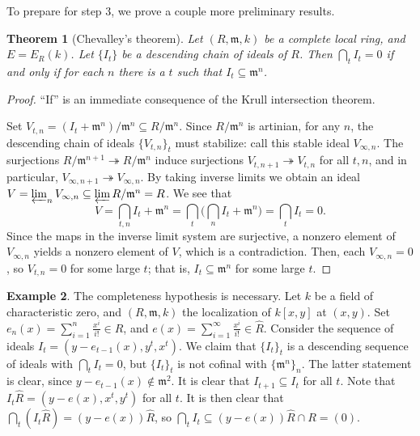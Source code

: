 \documentclass[11pt]{book}
\newtheorem{theorem}{Theorem}[chapter]
\numberwithin{equation}{section}
\numberwithin{theorem}{chapter}
\theoremstyle{definition}
\newtheorem{example}[theorem]{Example}
\newtheorem*{basic properties}{Basic Properties}
\newtheorem*{Important Remark}{Important Remark}
\theoremstyle{remark}
\newcommand{\m}{\mathfrak{m}}
\begin{document}
To prepare for step 3, we prove a couple more preliminary results.

\begin{theorem}[Chevalley's theorem]
	Let $(R,\m,k)$ be a complete local ring, and $E=E_R(k)$. Let $\{I_t\}$ be a descending chain of ideals of $R$. Then $\bigcap_t I_t=0$ if and only if for each $n$ there is a $t$ such that $I_{t} \subseteq \m^n$.
\end{theorem}
\begin{proof}
	``If'' is an immediate consequence of the Krull intersection theorem.
	
Set $V_{t,n}=(I_t + \m^n) / \m^n \subseteq R/\m^n$. Since $R/\m^n$ is artinian, for any $n$, the descending chain of ideals $\{ V_{t,n} \}_t$ must stabilize: call this stable ideal $V_{\infty,n}$. The surjections $R/\m^{n+1}\twoheadrightarrow R/\m^{n}$ induce surjections $V_{t,n+1}\twoheadrightarrow V_{t,n}$ for all $t,n$, and in particular, $V_{\infty,n+1}\twoheadrightarrow V_{\infty,n}$. By taking inverse limits we obtain an ideal $V=\varprojlim_n V_{\infty,n} \subseteq \varprojlim R/\m^n = R$.
We see that 
\[V = \bigcap_{t,n} I_t + \m^n = \bigcap_t \Big( \bigcap_n I_t + \m^n \big) = \bigcap_t I_t =0.\]
Since the maps in the inverse limit system are surjective, a nonzero element of $V_{\infty,n}$ yields a nonzero element of $V$, which is a contradiction. Then, each $V_{\infty,n}=0$, so $V_{t,n}=0$ for some large $t$; that is, $I_t\subseteq \m^n$ for some large $t$. 
\end{proof}

\begin{example}
	The completeness hypothesis is necessary. Let $k$ be a field of characteristic zero, and $(R,\m,k)$ the localization of $k[x,y]$ at $(x,y)$. Set $e_n(x)=\sum_{i=1}^n \frac{x^i}{i!} \in R$, and $e(x)= \sum_{i=1}^{\infty} \frac{x^i}{i!} \in \widehat{R}$. Consider the sequence of ideals $I_t=(y-e_{t-1}(x),y^t,x^t)$. We claim that $\{I_t\}_t$ is a descending sequence of ideals with  $\bigcap_t I_t = 0$, but $\{I_t\}_t$ is not cofinal with $\{\m^n\}_n$. The latter statement is clear, since $y-e_{t-1}(x)\notin \m^2$. It is clear that $I_{t+1}\subseteq I_t$ for all $t$. Note that $I_t \widehat{R} = (y-e(x),x^t,y^t)$ for all $t$. It is then clear that $\bigcap_t (I_t \widehat{R}) = (y-e(x))\widehat{R}$, so $\bigcap_t I_t \subseteq (y-e(x))\widehat{R} \cap R = (0)$.
\end{example}
\end{document}
